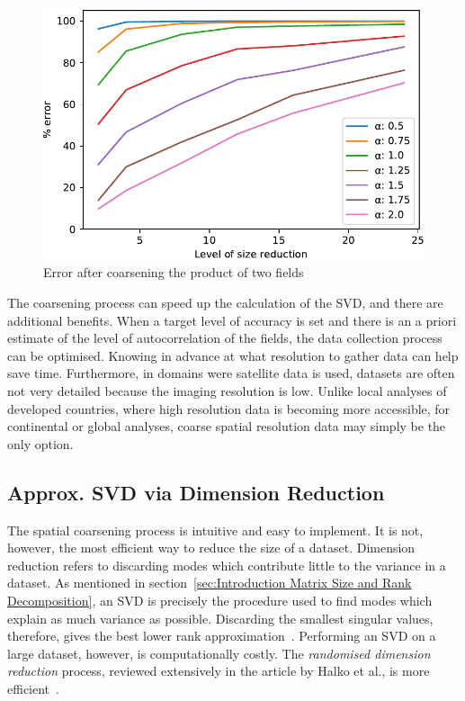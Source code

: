 \documentclass[sigconf]{acmart}
\begin{document}
\begin{figure}[h]
\begin{center}
\includegraphics[width=0.8\columnwidth]{Results/plotProductSpatialTemporalFieldsViaCoarsening.pdf}
\caption[Error after coarsening product of fields]{Error after coarsening the product of two fields}
\label{fig:plotProductSpatialTemporalFieldsViaCoarsening}
\end{center}
\end{figure}
The coarsening process can speed up the calculation of the SVD, and there are additional benefits. When a target level of accuracy is set and there is an a priori estimate of the level of autocorrelation of the fields, the data collection process can be optimised. Knowing in advance at what resolution to gather data can help save time. Furthermore, in domains were satellite data is used, datasets are often not very detailed because the imaging resolution is low. Unlike local analyses of developed countries, where high resolution data is becoming more accessible, for continental or global analyses, coarse spatial resolution data may simply be the only option.

\subsection{Approx. SVD via Dimension Reduction}
\label{sec:Techniques Approximate SVD via Dimension Reduction}

The spatial coarsening process is intuitive and easy to implement. It is not, however, the most efficient way to reduce the size of a dataset. Dimension reduction refers to discarding modes which contribute little to the variance in a dataset. As mentioned in section~\ref{sec:Introduction Matrix Size and Rank Decomposition}, an SVD is precisely the procedure used to find modes which explain as much variance as possible. Discarding the smallest singular values, therefore, gives the best lower rank approximation~\cite{Eckart1936, Martinsson2016}. Performing an SVD on a large dataset, however, is computationally costly. The \textit{randomised dimension reduction} process, reviewed extensively in the article by Halko et al., is more efficient~\cite{Halko2011, Li2016}.
\end{document}
